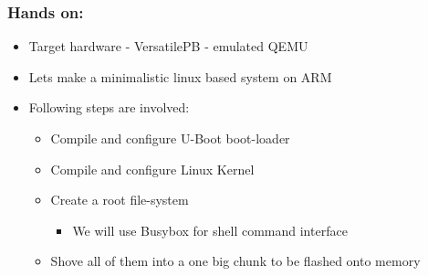 \documentclass[11pt]{beamer}
\begin{document}
\begin{frame}[fragile]\frametitle{Hands on:}
\label{sec-4.5}

\begin{itemize}

\item Target hardware - VersatilePB - emulated QEMU\\
\label{sec-4.5.1}


\item Lets make a minimalistic linux based system on ARM\\
\label{sec-4.5.2}


\item Following steps are involved:\\
\label{sec-4.5.3}

\begin{itemize}
\item Compile and configure U-Boot boot-loader
\item Compile and configure Linux Kernel
\item Create a root file-system

\begin{itemize}
\item We will use Busybox for shell command interface
\end{itemize}

\item Shove all of them into a one big chunk to be flashed onto memory
\end{itemize}
\end{itemize} %
\end{frame}
\end{document}
